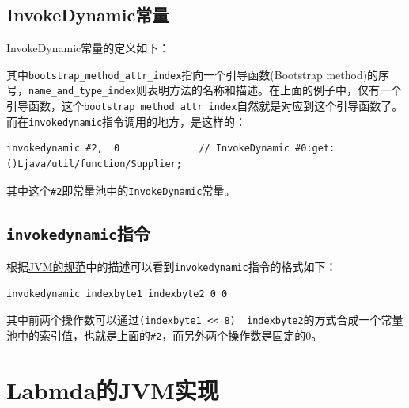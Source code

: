 \documentclass[12pt]{article}
\begin{document}
\subsection{InvokeDynamic常量}\label{invokedynamicux5e38ux91cf}

InvokeDynamic常量的定义如下：

\begin{Shaded}
\begin{Highlighting}[]
\OperatorTok{\{}
\OperatorTok{;}
\OperatorTok{;}
\OperatorTok{;}
\OperatorTok{\}}
\end{Highlighting}
\end{Shaded}

其中\texttt{bootstrap\_method\_attr\_index}指向一个引导函数(Bootstrap method)的序号，\texttt{name\_and\_type\_index}则表明方法的名称和描述。在上面的例子中，仅有一个引导函数，这个\texttt{bootstrap\_method\_attr\_index}自然就是对应到这个引导函数了。而在\texttt{invokedynamic}指令调用的地方，是这样的：

\begin{verbatim}
invokedynamic #2,  0              // InvokeDynamic #0:get:()Ljava/util/function/Supplier;
\end{verbatim}

其中这个\texttt{\#2}即常量池中的\texttt{InvokeDynamic}常量。

\subsection{\texorpdfstring{\texttt{invokedynamic}指令}{invokedynamic指令}}\label{invokedynamicux6307ux4ee4-1}

根据\href{https://docs.oracle.com/javase/specs/jvms/se7/html/jvms-6.html\#jvms-6.5.invokedynamic}{JVM的规范}中的描述可以看到\texttt{invokedynamic}指令的格式如下：

\begin{verbatim}
invokedynamic indexbyte1 indexbyte2 0 0
\end{verbatim}

其中前两个操作数可以通过\texttt{(indexbyte1\ \textless{}\textless{}\ 8)\ \textbar{}\ indexbyte2}的方式合成一个常量池中的索引值，也就是上面的\texttt{\#2}，而另外两个操作数是固定的0。

\section{Labmda的JVM实现}\label{labmdaux7684jvmux5b9eux73b0}
\end{document}
